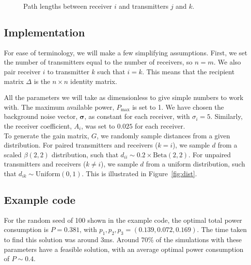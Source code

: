 \documentclass[twocolumn,secnumarabic,amssymb, nobibnotes, aps, prl,superscriptaddress]{revtex4-1}
\begin{document}
\begin{figure}[H]
\centering
{}
\caption{\label{fig:pathgain}Path lengths between receiver $i$ and transmitters $j$ and $k$.}
\end{figure}

\subsection{Implementation}
\noindent For ease of terminology, we will make a few simplifying assumptions.  First, we set the number of transmitters equal to the number of receivers, so $n=m$.  We also pair receiver $i$ to transmitter $k$ such that $i=k$.  This means that the recipient matrix $\Delta$ is the $n\times n$ identity matrix.

All the parameters we will take as dimensionless to give simple numbers to work with.  The maximum available power, $P_{\text{max}}$ is set to 1.  We have chosen the background noise vector, $\boldsymbol{\sigma}$, as constant for each receiver, with $\sigma_i = 5$.  Similarly, the receiver coefficient, $A_i$, was set to $0.025$ for each receiver. \\ 

To generate the gain matrix, $G$, we randomly sample distances from a given distribution.  For paired transmitters and receivers ($k=i$), we sample $d$ from a scaled $\beta(2,2)$ distribution, such that $d_{ii} \sim 0.2\times\text{Beta}(2,2)$.  For unpaired transmitters and receivers ($k\neq i$), we sample $d$ from a uniform distribution, such that $d_{ik} \sim \text{Uniform}(0,1)$.  This is illustrated in Figure~\ref{fig:dist}.

\subsection{Example code}
\noindent For the random seed of 100 shown in the example code, the optimal total power consumption is $P = 0.381$, with $p_1,p_2,p_3 = (0.139, 0.072, 0.169)$.  The time taken to find this solution was around 3ms.  Around 70\% of the simulations with these parameters have a feasible solution, with an average optimal power consumption of $P\sim0.4$.
\end{document}
